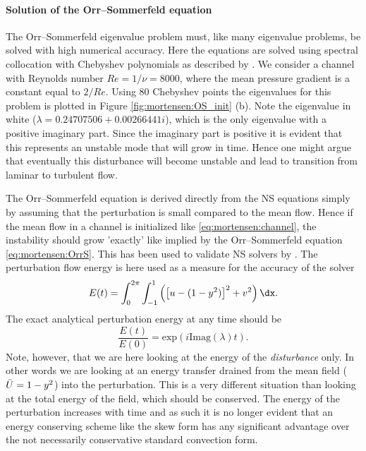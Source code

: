 \paragraph{Solution of the Orr--Sommerfeld equation}

The Orr--Sommerfeld eigenvalue problem must, like many eigenvalue
problems, be solved with high numerical accuracy. Here the equations
are solved using spectral collocation with Chebyshev polynomials as
described by \citet{Trefethen2006}. We consider a channel with Reynolds
number $Re=1/\nu=8000$, where the mean pressure gradient is a constant
equal to $2/Re$. Using 80 Chebyshev points the eigenvalues for this
problem is plotted in Figure \ref{fig:mortensen:OS_init} (b). Note the
eigenvalue in white ($\lambda = 0.24707506 + 0.00266441 i$), which is the
only eigenvalue with a positive imaginary part. Since the imaginary part
is positive it is evident that this represents an unstable mode that will
grow in time. Hence one might argue that eventually this disturbance will
become unstable and lead to transition from laminar to turbulent flow.

The Orr--Sommerfeld equation is derived directly from the NS equations
simply by assuming that the perturbation is small compared to the
mean flow. Hence if the mean flow in a channel is initialized like
\eqref{eq:mortensen:channel}, the instability should grow 'exactly' like
implied by the Orr--Sommerfeld equation \eqref{eq:mortensen:OrrS}. This
has been used to validate NS solvers by \citet{MalikZangHussaini1984}. The
perturbation flow energy is here used as a measure for the accuracy of
the solver
\begin{equation}
  E(t)= \int_0^{2\pi}\int_{-1}^{1} \left( \left[u-(1-y^2)\right]^2
    + v^2 \right) \dx.
\end{equation}
The exact analytical perturbation energy at any time should be
\begin{equation}
 \frac{E(t)}{E(0)}=\text{exp}(i \text{Imag}(\lambda) t).
\end{equation}
Note, however, that we are here looking at the energy of the
\textit{disturbance} only. In other words we are looking at an energy
transfer drained from the mean field ($\Bar{U}=1-y^2$) into the
perturbation. This is a very different situation than looking at the
total energy of the field, which should be conserved. The energy of the
perturbation increases with time and as such it is no longer evident
that an energy conserving scheme like the skew form has any significant
advantage over the not necessarily conservative standard convection form.


